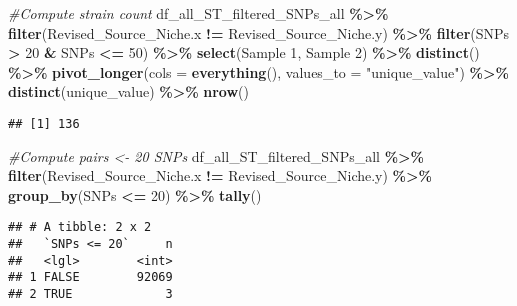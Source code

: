 \documentclass[
]{article}
\newenvironment{Shaded}{\begin{snugshade}}{\end{snugshade}}
\newcommand{\AttributeTok}[1]{\textcolor[rgb]{0.13,0.29,0.53}{#1}}
\newcommand{\CommentTok}[1]{\textcolor[rgb]{0.56,0.35,0.01}{\textit{#1}}}
\newcommand{\DecValTok}[1]{\textcolor[rgb]{0.00,0.00,0.81}{#1}}
\newcommand{\FunctionTok}[1]{\textcolor[rgb]{0.13,0.29,0.53}{\textbf{#1}}}
\newcommand{\NormalTok}[1]{#1}
\newcommand{\SpecialCharTok}[1]{\textcolor[rgb]{0.81,0.36,0.00}{\textbf{#1}}}
\newcommand{\StringTok}[1]{\textcolor[rgb]{0.31,0.60,0.02}{#1}}
\begin{document}
\begin{Shaded}
\begin{Highlighting}[]
\CommentTok{\#Compute strain count}
\NormalTok{df\_all\_ST\_filtered\_SNPs\_all }\SpecialCharTok{\%\textgreater{}\%} \FunctionTok{filter}\NormalTok{(Revised\_Source\_Niche.x }\SpecialCharTok{!=}\NormalTok{ Revised\_Source\_Niche.y) }\SpecialCharTok{\%\textgreater{}\%}
  \FunctionTok{filter}\NormalTok{(SNPs }\SpecialCharTok{\textgreater{}} \DecValTok{20} \SpecialCharTok{\&}\NormalTok{ SNPs }\SpecialCharTok{\textless{}=} \DecValTok{50}\NormalTok{) }\SpecialCharTok{\%\textgreater{}\%}
  \FunctionTok{select}\NormalTok{(}\StringTok{\textasciigrave{}}\AttributeTok{Sample 1}\StringTok{\textasciigrave{}}\NormalTok{, }\StringTok{\textasciigrave{}}\AttributeTok{Sample 2}\StringTok{\textasciigrave{}}\NormalTok{) }\SpecialCharTok{\%\textgreater{}\%}
  \FunctionTok{distinct}\NormalTok{() }\SpecialCharTok{\%\textgreater{}\%}
  \FunctionTok{pivot\_longer}\NormalTok{(}\AttributeTok{cols =} \FunctionTok{everything}\NormalTok{(), }\AttributeTok{values\_to =} \StringTok{"unique\_value"}\NormalTok{) }\SpecialCharTok{\%\textgreater{}\%}
  \FunctionTok{distinct}\NormalTok{(unique\_value) }\SpecialCharTok{\%\textgreater{}\%} \FunctionTok{nrow}\NormalTok{()}
\end{Highlighting}
\end{Shaded}

\begin{verbatim}
## [1] 136
\end{verbatim}

\begin{Shaded}
\begin{Highlighting}[]
\CommentTok{\#Compute pairs \textless{}{-} 20 SNPs}
\NormalTok{df\_all\_ST\_filtered\_SNPs\_all }\SpecialCharTok{\%\textgreater{}\%} \FunctionTok{filter}\NormalTok{(Revised\_Source\_Niche.x }\SpecialCharTok{!=}\NormalTok{ Revised\_Source\_Niche.y) }\SpecialCharTok{\%\textgreater{}\%} \FunctionTok{group\_by}\NormalTok{(SNPs }\SpecialCharTok{\textless{}=} \DecValTok{20}\NormalTok{) }\SpecialCharTok{\%\textgreater{}\%} \FunctionTok{tally}\NormalTok{()}
\end{Highlighting}
\end{Shaded}

\begin{verbatim}
## # A tibble: 2 x 2
##   `SNPs <= 20`     n
##   <lgl>        <int>
## 1 FALSE        92069
## 2 TRUE             3
\end{verbatim}
\end{document}
